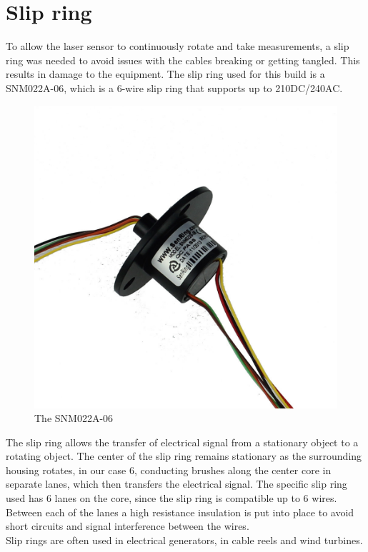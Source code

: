 \clearpage
\section{Slip ring}

To allow the laser sensor to continuously rotate and take measurements, a slip ring was needed to avoid issues with the cables breaking or getting tangled. This results in damage to the equipment. 
The slip ring used for this build is a SNM022A-06\cite{slipring}, which is a 6-wire slip ring that supports up to 210DC/240AC. 

\begin{figure}[H]
	\centering
	\includegraphics[width=.5\linewidth]{images/slipring-pic.jpg}
	\caption{The SNM022A-06}
	\label{slipringpic}	
\end{figure}

The slip ring allows the transfer of electrical signal from a stationary object to a rotating object. The center of the slip ring remains stationary as the surrounding housing rotates, in our case 6, conducting brushes along the center core in separate lanes, which then transfers the electrical signal.
The specific slip ring used has 6 lanes on the core, since the slip ring is compatible up to 6 wires. Between each of the lanes a high resistance insulation is put into place to avoid short circuits and signal interference between the wires\cite{slipringhow}.\\
Slip rings are often used in electrical generators, in cable reels and wind turbines.


